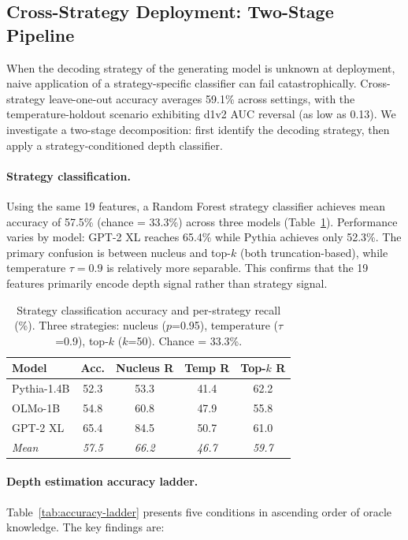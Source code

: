 \documentclass[11pt,a4paper]{article}
\begin{document}
\subsection{Cross-Strategy Deployment: Two-Stage Pipeline}
\label{sec:cross-strategy}

When the decoding strategy of the generating model is unknown at deployment, naive application of a strategy-specific classifier can fail catastrophically. Cross-strategy leave-one-out accuracy averages 59.1\% across settings, with the temperature-holdout scenario exhibiting d1v2 AUC reversal (as low as 0.13). We investigate a two-stage decomposition: first identify the decoding strategy, then apply a strategy-conditioned depth classifier.

\paragraph{Strategy classification.} Using the same 19 features, a Random Forest strategy classifier achieves mean accuracy of 57.5\% (chance = 33.3\%) across three models (Table~\ref{tab:strategy-clf}). Performance varies by model: GPT-2 XL reaches 65.4\% while Pythia achieves only 52.3\%. The primary confusion is between nucleus and top-$k$ (both truncation-based), while temperature $\tau = 0.9$ is relatively more separable. This confirms that the 19 features primarily encode depth signal rather than strategy signal.

\begin{table}[t]
\centering
\caption{Strategy classification accuracy and per-strategy recall (\%). Three strategies: nucleus ($p$=0.95), temperature ($\tau$=0.9), top-$k$ ($k$=50). Chance = 33.3\%.}
\label{tab:strategy-clf}
\begin{tabular}{lcccc}
\toprule
\textbf{Model} & \textbf{Acc.} & \textbf{Nucleus R} & \textbf{Temp R} & \textbf{Top-$k$ R} \\
\midrule
Pythia-1.4B & 52.3 & 53.3 & 41.4 & 62.2 \\
OLMo-1B & 54.8 & 60.8 & 47.9 & 55.8 \\
GPT-2 XL & 65.4 & 84.5 & 50.7 & 61.0 \\
\midrule
\textit{Mean} & \textit{57.5} & \textit{66.2} & \textit{46.7} & \textit{59.7} \\
\bottomrule
\end{tabular}
\end{table}

\paragraph{Depth estimation accuracy ladder.} Table~\ref{tab:accuracy-ladder} presents five conditions in ascending order of oracle knowledge. The key findings are:
\end{document}
